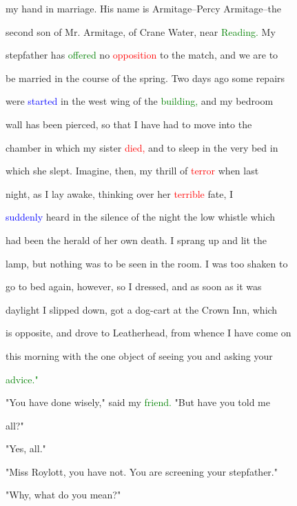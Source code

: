  my hand in \textcolor{BurntOrange}{marriage.} His name is Armitage--Percy Armitage--the

 second son of Mr. Armitage, of Crane Water, near \textcolor{green}{Reading.} My

 stepfather has \textcolor{green}{offered} no \textcolor{red}{opposition} to the match, and we are to

 be married in the course of the spring. Two days ago some repairs

 were \textcolor{blue}{started} in the west wing of the \textcolor{green}{building,} and my bedroom

 wall has been pierced, so that I have had to move into the

 chamber in which my sister \textcolor{red}{died,} and to sleep in the very bed in

 which she slept. Imagine, then, my \textcolor{BurntOrange}{thrill} of \textcolor{red}{terror} when last

 night, as I lay awake, thinking over her \textcolor{red}{terrible} \textcolor{BurntOrange}{fate,} I

 \textcolor{blue}{suddenly} heard in the silence of the night the low whistle which

 had been the herald of her own \textcolor{BurntOrange}{death.} I sprang up and lit the

 lamp, but nothing was to be seen in the room. I was too shaken to

 go to bed again, however, so I dressed, and as soon as it was

 daylight I \textcolor{BurntOrange}{slipped} down, got a dog-cart at the Crown Inn, which

 is opposite, and drove to Leatherhead, from whence I have come on

 this morning with the one object of seeing you and asking your

 \textcolor{green}{advice."}



 "You have done wisely," said my \textcolor{green}{friend.} "But have you told me

 all?"



 "Yes, all."



 "Miss Roylott, you have not. You are screening your stepfather."



 "Why, what do you mean?"




